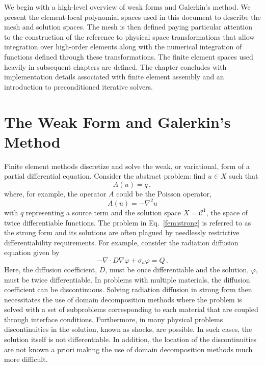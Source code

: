 \documentclass[../doc.tex]{subfiles}
\begin{document}
We begin with a high-level overview of weak forms and Galerkin's method. We present the element-local polynomial spaces used in this document to describe the mesh and solution spaces. The mesh is then defined paying particular attention to the construction of the reference to physical space transformations that allow integration over high-order elements along with the numerical integration of functions defined through these transformations. The finite element spaces used heavily in subsequent chapters are defined. The chapter concludes with implementation details associated with finite element assembly and an introduction to preconditioned iterative solvers. 

\section{The Weak Form and Galerkin's Method}
Finite element methods discretize and solve the weak, or variational, form of a partial differential equation. Consider the abstract problem: find $u \in X$ such that 
	\begin{equation} \label{fem:strong}
		A(u) = q \,,
	\end{equation}
where, for example, the operator $A$ could be the Poisson operator, 
	\begin{equation}
		A(u) = -\nabla^2u
	\end{equation}
with $q$ representing a source term and the solution space $X = \mathcal{C}^1$, the space of twice differentiable functions. The problem in Eq.~\ref{fem:strong} is referred to as the strong form and its solutions are often plagued by needlessly restrictive differentiability requirements. For example, consider the radiation diffusion equation given by
	\begin{equation} \label{fem:rad_strong}
		-\nabla\cdot D \nabla\varphi + \sigma_a \varphi = Q \,. 
	\end{equation}
Here, the diffusion coefficient, $D$, must be once differentiable and the solution, $\varphi$, must be twice differentiable. In problems with multiple materials, the diffusion coefficient can be discontinuous. Solving radiation diffusion in strong form then necessitates the use of domain decomposition methods where the problem is solved with a set of subproblems corresponding to each material that are coupled through interface conditions.  Furthermore, in many physical problems discontinuities in the solution, known as shocks, are possible. In such cases, the solution itself is not differentiable. In addition, the location of the discontinuities are not known a priori making the use of domain decomposition methods much more difficult. 
\end{document}
